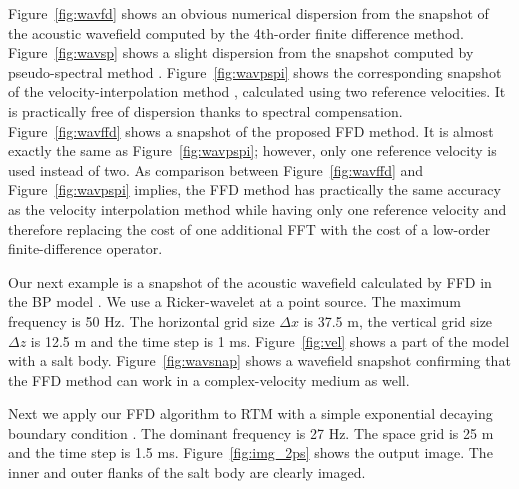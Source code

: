 Figure~\ref{fig:wavfd} shows an obvious numerical dispersion from the snapshot of the acoustic wavefield computed by the 4th-order finite difference method. 
Figure~\ref{fig:wavsp} shows a slight dispersion from the snapshot computed by pseudo-spectral method \cite[]{reshef}. 
Figure~\ref{fig:wavpspi} shows the corresponding snapshot of the velocity-interpolation method \cite[]{etgen,crawley}, calculated using two reference velocities. 
It is practically free of dispersion thanks to spectral compensation.
Figure~\ref{fig:wavffd} shows a snapshot of the proposed FFD method. 
It is almost exactly the same as Figure~\ref{fig:wavpspi}; 
however, only one reference velocity is used instead of two.
As comparison between Figure~\ref{fig:wavffd} and Figure~\ref{fig:wavpspi} implies, 
the FFD method has practically the same accuracy as the velocity interpolation method 
while having only one reference velocity and therefore  
replacing the cost of one additional FFT with the cost of a low-order finite-difference operator. 
\\




Our next example is a snapshot of the acoustic wavefield calculated by FFD in the BP model \cite[]{bp}. We use a Ricker-wavelet at a point source. The maximum frequency is 50 Hz. The horizontal grid size $\Delta x$ is 37.5 m, the vertical grid size $\Delta z$ is 12.5 m and the time step is 1 ms. 
Figure~\ref{fig:vel} shows a part of the model with a salt body.
Figure~\ref{fig:wavsnap} shows a wavefield snapshot confirming that the FFD method can work in a complex-velocity medium as well.\\




Next we apply our FFD algorithm to RTM with a simple exponential decaying boundary condition \cite[]{cerjan}. The dominant frequency is 27 Hz. The space grid is 25 m and the time step is 1.5 ms. Figure~\ref{fig:img_2ps} shows the output image. The inner and outer flanks of the salt body are clearly imaged.\\ 

